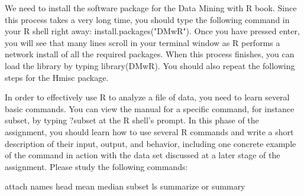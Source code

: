 We need to install the software package for the Data Mining with R book. Since this process takes a very long time, you
should type the following command in your R shell right away: install.packages("DMwR"). Once you have pressed enter, you
will see that many lines scroll in your terminal window as R performs a network install of all the required packages.
When this process finishes, you can load the library by typing library(DMwR). You should also repeat the following steps
for the Hmisc package.

In order to effectively use R to analyze a file of data, you need to learn several basic commands. You can view the
manual for a specific command, for instance subset, by typing ?subset at the R shell's prompt. In this phase of the
assignment, you should learn how to use several R commands and write a short description of their input, output, and
behavior, including one concrete example of the command in action with the data set discussed at a later stage of the
assignment. Please study the following commands:

attach
names
head
mean
median
subset
ls
summarize or summary

  


